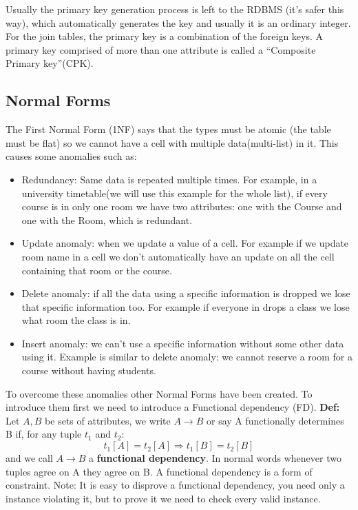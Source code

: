 \documentclass[a4page, 11pt]{article}
\begin{document}
Usually the primary key generation process is left to the RDBMS (it's safer this way), which automatically generates the key and usually it is an ordinary integer.
For the join tables, the primary key is a combination of the foreign keys. A primary key comprised of more than one attribute is called a ``Composite Primary key''(CPK).
\subsection{Normal Forms}
The First Normal Form (1NF) says that the types must be atomic (the table must be flat) so we cannot have a cell with multiple data(multi-list) in it. 
This causes some anomalies such as: 
\begin{itemize}[noitemsep]
	\item Redundancy: Same data is repeated multiple times. For example, in a university timetable(we will use this example for the whole list), if every course is in only one room we have two attributes: one with the Course and one with the Room, which is redundant.
	\item Update anomaly: when we update a value of a cell. For example if we update room name in a cell we don't automatically have an update on all the cell containing that room or the course.
	\item Delete anomaly: if all the data using a specific information is dropped we lose that specific information too. For example if everyone in drops a class we lose what room the class is in.
	\item Insert anomaly: we can't use a specific information without some other data using it. Example is similar to delete anomaly: we cannot reserve a room for a course without having students.
\end{itemize}
To overcome these anomalies other Normal Forms have been created. To introduce them first we need to introduce a Functional dependency (FD). \newline
\textbf{Def:} Let $A,B$ be sets of attributes, we write $A \rightarrow B$ or say A functionally determines B if, for any tuple $t_1$ and $t_2$:
$$t_1[A]=t_2[A] \Rightarrow t_1[B]=t_2[B]$$
and we call $A \rightarrow B$ a \textbf{functional dependency}.\newline
In normal words whenever two tuples agree on A they agree on B.
A functional dependency is a form of constraint.\newline
Note: It is easy to disprove a functional dependency, you need only a instance violating it, but to prove it we need to check every valid instance.
\end{document}
